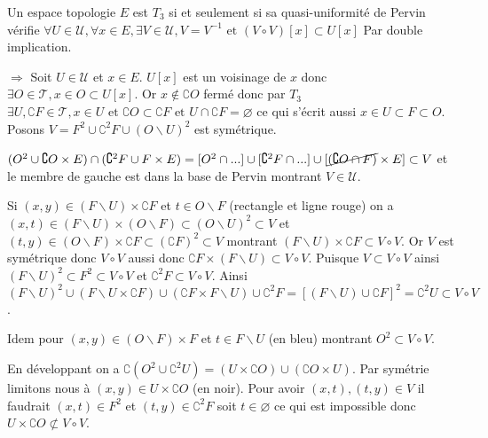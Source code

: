 \documentclass[a4paper, 11pt, french]{book}
\newenvironment{itemise}{\itemize}{\enditemize}
\theoremstyle{plain} %
\theoremstyle{definition} %
\theoremstyle{remark} %
\renewcommand{\setminus}{\backslash}
\newcommand{\1}{\mathds{1}}
\newcommand\vide{\varnothing}
\newcommand{\inv}[1]{#1^{-1}}
\newcommand\et{\text{ et }}
\begin{document}
\proposition
Un espace topologie $E$ est $T_3$ si et seulement si sa quasi-uniformité de Pervin vérifie $\forall U\in\mathscr{U}, \forall x\in E, \exists V\in\mathscr{U}, V=\inv{V}\et (V\circ V)[x]\subset U[x]$
\demonstration
Par double implication.
\begin{itemise}
	\item[$\Rightarrow$] %
	Soit $U\in\mathscr{U}$ et $x\in E$.
	$U[x]$ est un voisinage de $x$ donc $\exists O\in\mathscr{T}, x\in O\subset U[x]$.
	Or $x\notin\complement O$ fermé donc par $T_3$ $\exists U, \complement F\in\mathscr{T}, x\in U\et\complement O\subset\complement F\et U\cap\complement F=\vide$ ce qui s'écrit aussi $x\in U\subset F\subset O$.
	Posons $V=F^2\cup\complement^2F\cup(O\setminus U)^2$ est symétrique.
	\begin{itemise}
		\item $(O^2\cup\complement O\times E)\cap(\complement^2F\cup F\times E)=[O^2\cap...]\cup[\complement^2F\cap...]\cup[\cancel{(\complement O\cap F)}\times E]\subset V$ et le membre de gauche est dans la base de Pervin montrant $V\in\mathscr{U}$.
		\item Si $(x, y)\in(F\setminus U)\times\complement F$ et $t\in O\setminus F$ (rectangle et ligne rouge) on a $(x, t)\in(F\setminus U)\times(O\setminus F)\subset(O\setminus U)^2\subset V$ et $(t, y)\in(O\setminus F)\times\complement F\subset(\complement F)^2\subset V$ montrant $(F\setminus U)\times\complement F\subset V\circ V$.
		Or $V$ est symétrique donc $V\circ V$ aussi donc $\complement F\times(F\setminus U)\subset V\circ V$.
		Puisque $V\subset V\circ V$ ainsi $(F\setminus U)^2\subset F^2\subset V\circ V$ et $\complement^2 F\subset V\circ V$.
		Ainsi $(F\setminus U)^2\cup(F\setminus U\times\complement F)\cup(\complement F\times F\setminus U)\cup\complement^2F=[(F\setminus U)\cup\complement F]^2=\complement^2U\subset V\circ V$.
		\item Idem pour $(x, y)\in(O\setminus F)\times F$ et $t\in F\setminus U$ (en bleu) montrant $O^2\subset V\circ V$.
		\item En développant on a $\complement(O^2\cup\complement^2 U)=(U\times\complement O)\cup(\complement O\times U)$.
		Par symétrie limitons nous à $(x, y)\in U\times\complement O$  (en noir).
		Pour avoir $(x, t), (t, y)\in V$ il faudrait $(x, t)\in F^2$ et $(t, y)\in\complement^2F$ soit $t\in\vide$ ce qui est impossible donc $U\times\complement O\not\subset V\circ V$.
	\end{itemise}
	\begin{center}
		\begin{tikzpicture}[scale=3]

\end{tikzpicture}
\end{center}
\end{itemise}
\end{document}
